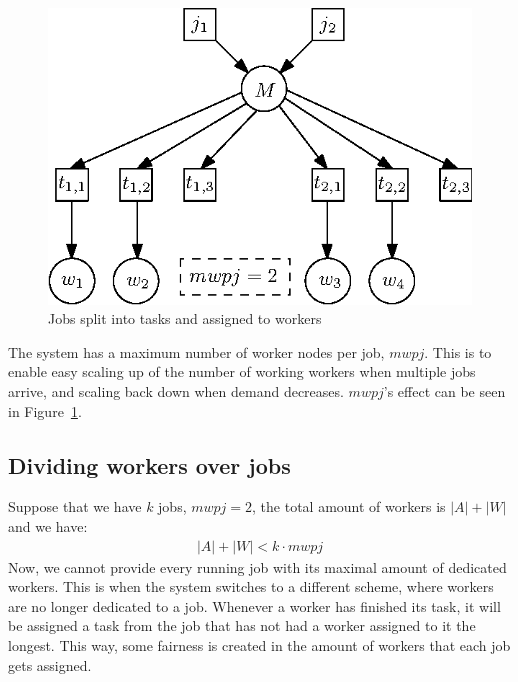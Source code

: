 \begin{figure}[ht!]
    \center
    \includegraphics{./img/splitjobtotasks.eps}
    \caption{Jobs split into tasks and assigned to workers}
    \label{fig:splitjobtotasks}
\end{figure}

The system has a maximum number of worker nodes per job, $mwpj$.
This is to enable easy scaling up of the number of working workers when multiple jobs arrive, and scaling back down when demand decreases.
$mwpj$'s effect can be seen in Figure~\ref{fig:splitjobtotasks}.

\subsection{Dividing workers over jobs}
Suppose that we have $k$ jobs, $mwpj = 2$, the total amount of workers is $|A| + |W|$ and we have:
\begin{align*}|A|+|W| < k \cdot mwpj\end{align*}
Now, we cannot provide every running job with its maximal amount of dedicated workers.
This is when the system switches to a different scheme, where workers are no longer dedicated to a job.
Whenever a worker has finished its task, it will be assigned a task from the job that has not had a worker assigned to it the longest.
This way, some fairness is created in the amount of workers that each job gets assigned.